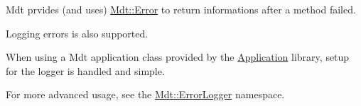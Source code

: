 Mdt prvides (and uses) \hyperlink{class_mdt_1_1_error}{Mdt\+::\+Error} to return informations after a method failed.

Logging errors is also supported.

When using a Mdt application class provided by the \hyperlink{libs_Application}{Application} library, setup for the logger is handled and simple.

For more advanced usage, see the \hyperlink{namespace_mdt_1_1_error_logger}{Mdt\+::\+Error\+Logger} namespace. 